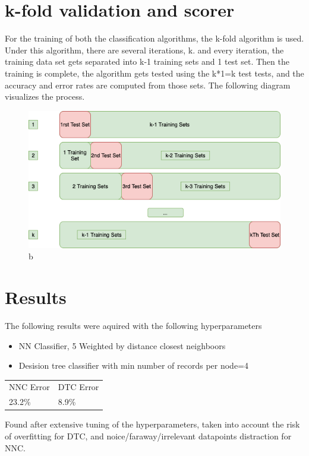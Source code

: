 \documentclass[openany]{book}
\begin{document}
		\section{k-fold validation and scorer}
			For the training of both the classification algorithms, the k-fold algorithm is used. Under this algorithm, there are several 
			iterations, k. and every iteration, the training data set gets separated into k-1 training sets and 1 test set. Then the training is complete,
			the algorithm gets tested using the k*1=k test tests, and the accuracy and error rates are computed from those sets. The following diagram visualizes the process.
			\begin{figure}[H]
				\iftrue
				\centering
				\caption{b}
				\includegraphics[scale=0.5]{res/kfold}
				\fi
			\end{figure}
		\section{Results}
			The following results were aquired with the following hyperparameters
			\begin{itemize}
				\item NN Classifier, 5 Weighted by distance closest neighboors
				\item Desision tree classifier with min number of records per node=4 
			\end{itemize}
			\begin{table}[H]
				\centering
				\begin{tabular}{ll}
					NNC Error & DTC Error \\
					23.2\%   & 8.9\%
				\end{tabular}
			\end{table}
			Found after extensive tuning of the hyperparameters, taken into account the risk of overfitting for DTC, and noice/faraway/irrelevant datapoints distraction for NNC. 
			
			
			
		
	
			
			
		
\end{document}
